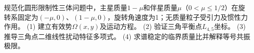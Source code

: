 规范化圆形限制性三体问题中，主星质量\(1-\mu\)和伴星质量\(\mu\)（\(0<\mu\le1/2\)）在旋转系固定为\((-\mu,0)\)、\((1-\mu,0)\)，旋转角速度为1；无质量粒子受引力及惯性力作用。
(1) 建立有效势\(\Omega(x,y)\)及运动方程。
(2) 验证三角平衡点\(L_{4,5}\)坐标。
(3) 推导三角点二维线性扰动特征多项式。
(4) 求谱稳定的临界质量比并解释等号共振极限。
